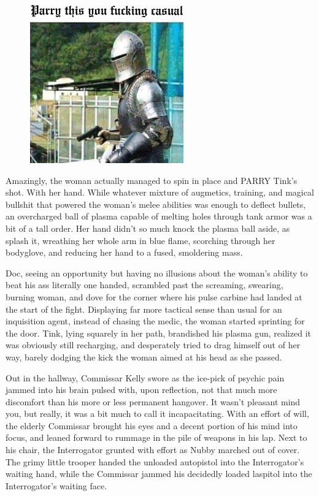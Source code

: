 \begin{figure}
	\begin{center}
		\includegraphics[width=\figwidth]{pics/21/96.png}
	\end{center}
\end{figure}
Amazingly, the woman actually managed to spin in place and PARRY Tink's shot. 
With her hand. 
While whatever mixture of augmetics, training, and magical bullshit that powered the woman's melee abilities was enough to deflect bullets, an overcharged ball of plasma capable of melting holes through tank armor was a bit of a tall order. 
Her hand didn't so much knock the plasma ball aside, as splash it, wreathing her whole arm in blue flame, scorching through her bodyglove, and reducing her hand to a fused, smoldering mass. 


Doc, seeing an opportunity but having no illusions about the woman's ability to beat his ass literally one handed, scrambled past the screaming, swearing, burning woman, and dove for the corner where his pulse carbine had landed at the start of the fight. 
Displaying far more tactical sense than usual for an inquisition agent, instead of chasing the medic, the woman started sprinting for the door. 
Tink, lying squarely in her path, brandished his plasma gun, realized it was obviously still recharging, and desperately tried to drag himself out of her way, barely dodging the kick the woman aimed at his head as she passed. 


Out in the hallway, Commissar Kelly swore as the ice-pick of psychic pain jammed into his brain pulsed with, upon reflection, not that much more discomfort than his more or less permanent hangover. 
It wasn't pleasant mind you, but really, it was a bit much to call it incapacitating. 
With an effort of will, the elderly Commissar brought his eyes and a decent portion of his mind into focus, and leaned forward to rummage in the pile of weapons in his lap. 
Next to his chair, the Interrogator grunted with effort as Nubby marched out of cover. 
The grimy little trooper handed the unloaded autopistol into the Interrogator's waiting hand, while the Commissar jammed his decidedly loaded laspitol into the Interrogator's waiting face.

